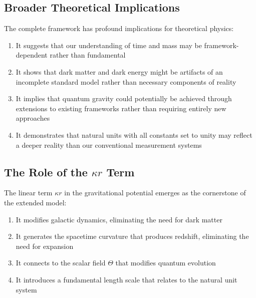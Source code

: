 \documentclass[12pt,a4paper]{article}
\begin{document}
	\subsection{Broader Theoretical Implications}
	\label{subsec:theoretical_implications}
	
	The complete framework has profound implications for theoretical physics\cite{pascher_zeit_masse_2025}:
	
	\begin{enumerate}
		\item It suggests that our understanding of time and mass may be framework-dependent rather than fundamental\cite{pascher_komplementaer_2025}
		\item It shows that dark matter and dark energy might be artifacts of an incomplete standard model rather than necessary components of reality\cite{pascher_galaxies_2025}
		\item It implies that quantum gravity could potentially be achieved through extensions to existing frameworks rather than requiring entirely new approaches\cite{pascher_emergente_gravitation_2025}
		\item It demonstrates that natural units with all constants set to unity may reflect a deeper reality than our conventional measurement systems\cite{pascher_alphabeta_2025}
	\end{enumerate}
	
	\subsection{The Role of the $\kappa r$ Term}
	\label{subsec:kappa_r_role}
	
	The linear term $\kappa r$ in the gravitational potential emerges as the cornerstone of the extended model\cite{pascher_galaxies_2025}:
	
	\begin{enumerate}
		\item It modifies galactic dynamics, eliminating the need for dark matter\cite{mcgaugh2016, pascher_galaxies_2025}
		\item It generates the spacetime curvature that produces redshift, eliminating the need for expansion\cite{pascher_messdifferenzen_2025}
		\item It connects to the scalar field $\Theta$ that modifies quantum evolution\cite{pascher_lagrange_2025}
		\item It introduces a fundamental length scale that relates to the natural unit system\cite{pascher_params_2025}
	\end{enumerate}
	
\end{document}
